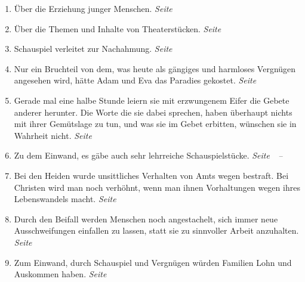 \begin{enumerate}
 \item Über die Erziehung junger Menschen.
 \dotfill \textit{Seite~\pageref{ref:17_01_erziehung}}\\

 \item Über die Themen und Inhalte von Theaterstücken.
 \dotfill \textit{Seite~\pageref{ref:17_01_schauspiel}}\\

 \item Schauspiel verleitet zur Nachahmung.
 \dotfill \textit{Seite~\pageref{ref:17_01_schauspiel_2}}\\

 \item Nur ein Bruchteil von dem, was heute als gängiges und harmloses Vergnügen
angesehen wird, hätte Adam und Eva das Paradies gekostet.
 \dotfill \textit{Seite~\pageref{ref:17_02_adam_und_eva}}\\

 \item Gerade mal eine halbe Stunde leiern sie mit erzwungenem Eifer die Gebete
anderer herunter. Die Worte die sie dabei sprechen, haben überhaupt nichts mit
ihrer Gemütslage zu tun, und was sie im Gebet erbitten, wünschen sie in Wahrheit
nicht.
 \dotfill \textit{Seite~\pageref{ref:17_04_gottesdienst}}\\

 \item Zu dem Einwand, es gäbe auch sehr lehrreiche Schauspielstücke.
 \dotfill
 \textit{
 Seite~\pageref{ref:17_07_einwand}~--~\pageref{ref:17_07_einwand_ende}}\\

 \item Bei den Heiden wurde unsittliches Verhalten von Amts wegen bestraft. Bei
Christen wird man noch verhöhnt, wenn man ihnen Vorhaltungen wegen ihres
Lebenswandels macht.
 \dotfill \textit{Seite~\pageref{ref:17_08_sittenwaechter}}\\

 \item Durch den Beifall werden Menschen noch angestachelt, sich immer neue
Ausschweifungen einfallen zu lassen, statt sie zu sinnvoller Arbeit anzuhalten.
 \dotfill \textit{Seite~\pageref{ref:17_09_bedarf_wecken}}\\

 \item Zum Einwand, durch Schauspiel und Vergnügen würden Familien Lohn und
Auskommen haben.
 \dotfill \textit{Seite~\pageref{ref:17_10_einwand}}\\


\end{enumerate}
